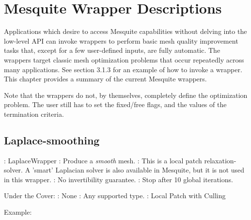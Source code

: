 \chapter{Mesquite Wrapper Descriptions}
\label{sec:wrappers}

Applications which desire to access Mesquite capabilities without delving 
into the low-level API can invoke wrappers to perform basic mesh quality 
improvement tasks that, except for a few user-defined inputs, are fully 
automatic. The wrappers target classic mesh optimization problems that occur 
repeatedly across many applications. See section 3.1.3 for an example of how
to invoke a wrapper. 
This chapter provides a summary of the current Mesquite wrappers. \newline

\noindent Note that the wrappers do not, by themselves, completely define
the optimization problem.  The user still has to set the fixed/free flags,
and the values of the termination criteria.  \newline

\section{Laplace-smoothing} \label{sec:LaplaceWrapper}

: LaplaceWrapper \newline
{}: Produce a {\it smooth} mesh. \newline
{}: This is a local patch relaxation-solver. A 'smart' 
Laplacian solver is also available in Mesquite, but it is not used in this 
wrapper.  \newline
{}: No invertibility guarantee. \newline 
{}: Stop after 10 global iterations. \newline \newline

\noindent Under the Cover: \newline
{}: None \newline
{}: Any supported type. \newline
{}: Local Patch with Culling \newline

\noindent Example: \newline

